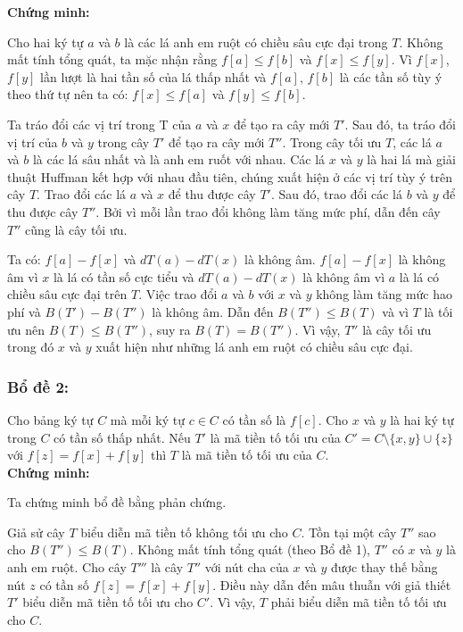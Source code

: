\textbf{Chứng minh:}

Cho hai ký tự $a$ và $b$ là các lá anh em ruột có chiều sâu cực đại trong $T$. Không mất tính tổng quát, ta mặc nhận rằng $f[a] \leq f[b]$ và $f[x] \leq f[y]$. Vì $f[x]$, $f[y]$ lần lượt là hai tần số của lá thấp nhất và $f[a]$, $f[b]$ là các tần số tùy ý theo thứ tự nên ta có: $f[x] \leq f[a]$ và $f[y] \leq f[b]$.

Ta tráo đổi các vị trí trong T của $a$ và $x$ để tạo ra cây mới $T'$. Sau đó, ta tráo đổi vị trí của $b$ và $y$ trong cây $T'$ để tạo ra cây mới $T''$. Trong cây tối ưu $T$, các lá $a$ và $b$ là các lá sâu nhất và là anh em ruốt với nhau. Các lá $x$ và $y$ là hai lá mà giải thuật Huffman kết hợp với nhau đầu tiên, chúng xuất hiện ở các vị trí tùy ý trên cây $T$. Trao đổi các lá $a$ và $x$ để thu được cây $T'$. Sau đó, trao đổi các lá $b$ và $y$ để thu được cây $T''$. Bởi vì mỗi lần trao đổi không làm tăng mức phí, dẫn đến cây $T''$ cũng là cây tối ưu.

Ta có: $f[a] - f[x]$ và $dT(a) - dT(x)$ là không âm. $f[a] - f[x]$ là không âm vì $x$ là lá có tần số cực tiểu và $dT(a) - dT(x)$ là không âm vì $a$ là lá có chiều sâu cực đại trên $T$. Việc trao đổi $a$ và $b$ với $x$ và $y$ không làm tăng mức hao phí và $B(T') - B(T'')$ là không âm. Dẫn đến $B(T'') \leq B(T)$ và vì $T$ là tối ưu nên $B(T) \leq B(T'')$, suy ra $B(T) = B(T'')$. Vì vậy, $T''$ là cây tối ưu trong đó $x$ và $y$ xuất hiện như những lá anh em ruột có chiều sâu cực đại. \\

\subsubsection{Bổ đề 2:} Cho bảng ký tự $C$ mà mỗi ký tự $c \in C$ có tần số là $f[c]$. Cho $x$ và $y$ là hai ký tự trong $C$ có tần số thấp nhất. Nếu $T'$ là mã tiền tố tối ưu của $C' = C\setminus\{x,y\} \cup \{z\}$ với $f[z] = f[x] + f[y]$ thì $T$ là mã tiền tố tối ưu của $C$. \\

\textbf{Chứng minh:}

Ta chứng minh bổ đề bằng phản chứng.

Giả sử cây $T$ biểu diễn mã tiền tố không tối ưu cho $C$. Tồn tại một cây $T''$ sao cho $B(T'') \leq B(T)$. Không mất tính tổng quát (theo Bổ đề 1), $T''$ có $x$ và $y$ là anh em ruột. Cho cây $T'''$ là cây $T''$ với nút cha của $x$ và $y$ được thay thế bằng nút $z$ có tần số $f[z] = f[x] + f[y]$. Điều này dẫn đến mâu thuẫn với giả thiết $T'$ biểu diễn mã tiền tố tối ưu cho $C'$. Vì vậy, $T$ phải biểu diễn mã tiền tố tối ưu cho $C$. \\

